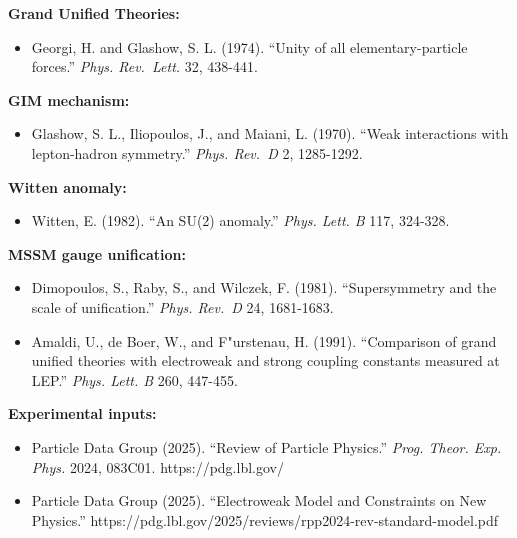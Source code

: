 \documentclass[11pt,a4paper]{article}
\theoremstyle{remark}
\providecommand{\tightlist}{%
  \setlength{\itemsep}{0pt}\setlength{\parskip}{0pt}}
\begin{document}
\textbf{Grand Unified Theories:}

\begin{itemize}
\tightlist
\item
  Georgi, H. and Glashow, S. L. (1974). ``Unity of all elementary-particle
  forces.'' \emph{Phys. Rev.~Lett.} 32, 438-441.
\end{itemize}

\textbf{GIM mechanism:}

\begin{itemize}
\tightlist
\item
  Glashow, S. L., Iliopoulos, J., and Maiani, L. (1970). ``Weak interactions
  with lepton-hadron symmetry.'' \emph{Phys. Rev.~D} 2, 1285-1292.
\end{itemize}

\textbf{Witten anomaly:}

\begin{itemize}
\tightlist
\item
  Witten, E. (1982). ``An SU(2) anomaly.'' \emph{Phys. Lett. B} 117, 324-328.
\end{itemize}

\textbf{MSSM gauge unification:}

\begin{itemize}
\tightlist
\item
  Dimopoulos, S., Raby, S., and Wilczek, F. (1981). ``Supersymmetry and the
  scale of unification.'' \emph{Phys. Rev.~D} 24, 1681-1683.
\item
  Amaldi, U., de Boer, W., and F"urstenau, H. (1991). ``Comparison of grand
  unified theories with electroweak and strong coupling constants measured
  at LEP.'' \emph{Phys. Lett. B} 260, 447-455.
\end{itemize}

\textbf{Experimental inputs:}

\begin{itemize}
\tightlist
\item
  Particle Data Group (2025). ``Review of Particle Physics.'' \emph{Prog. Theor.
  Exp. Phys.} 2024, 083C01. https://pdg.lbl.gov/
\item
  Particle Data Group (2025). ``Electroweak Model and Constraints on New
  Physics.'' https://pdg.lbl.gov/2025/reviews/rpp2024-rev-standard-model.pdf
\end{itemize}
\end{document}
